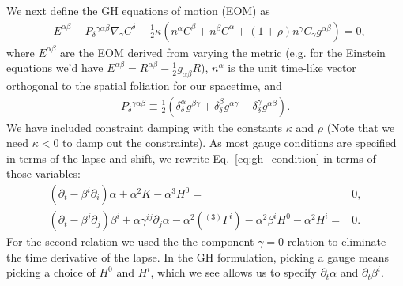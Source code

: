 \documentclass[%
notitlepage,
report,
nofootinbib,
 amsmath,amssymb,
 aps,
]{revtex4-1}
\begin{document}
   We next define the GH equations of motion (EOM) as
\begin{align}
\label{eq:GH_tensor_eom}
   &
   E^{\alpha\beta} 
-  P_{\delta}{}^{\gamma\alpha\beta}\nabla_{\gamma}C^{\delta}
-  \frac{1}{2}\kappa
   \left(
      n^{\alpha}C^{\beta}
   +  n^{\beta}C^{\alpha}
   +  \left(1+\rho\right)n^{\gamma}C_{\gamma}g^{\alpha\beta}
   \right)
   =
   0
   ,
\end{align}
   where $E^{\alpha\beta}$ are the EOM derived from varying the metric
(e.g. for the Einstein equations we'd have 
$E^{\alpha\beta}=R^{\alpha\beta}-\frac{1}{2}g_{\alpha\beta}R$),
$n^{\alpha}$ is the unit time-like vector orthogonal to the spatial foliation
for our spacetime, and
\begin{align}
   P_{\delta}{}^{\gamma\alpha\beta}
   \equiv
   \frac{1}{2}
   \left(
      \delta_{\delta}^{\alpha}g^{\beta\gamma}
   +  \delta_{\delta}^{\beta}g^{\alpha\gamma}
   -  \delta_{\delta}^{\gamma}g^{\alpha\beta}
   \right)
   .
\end{align}
   We have included constraint damping with the
constants $\kappa$ and $\rho$ \cite{Gundlach:2005eh}
(Note that we need $\kappa<0$ to damp out the constraints).
As most gauge conditions are specified in terms of the lapse and shift,
we rewrite Eq.~\eqref{eq:gh_condition} in terms of those variables:
\begin{subequations}
\label{eq:GH_evo_lapse_shift}
\begin{align}
   \left(
      \partial_t
   -  \beta^i\partial_i
   \right)
   \alpha
   +  \alpha^2K
   -  \alpha^3H^0
   =&
   0
   ,\\
   \left(
      \partial_t
   -  \beta^j\partial_j
   \right)
   \beta^i
+  \alpha\gamma^{ij}\partial_j\alpha
-  \alpha^2\left({}^{(3)}\Gamma^i\right)
-  \alpha^2\beta^iH^0
-  \alpha^2H^i
   =&
   0
   .
\end{align}   
\end{subequations}
   For the second relation we used the the component $\gamma=0$ relation
to eliminate the time derivative of the lapse.
In the GH formulation, picking a gauge means picking
a choice of $H^0$ and $H^i$, which we see allows us to specify
$\partial_t\alpha$ and $\partial_t\beta^i$.

\end{document}
